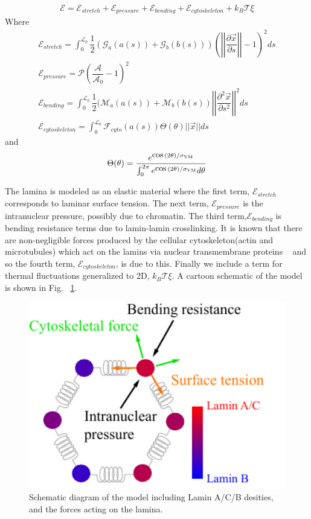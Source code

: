 \begin{align}
\mathcal{E} = \mathcal{E}_{stretch} + \mathcal{E}_{pressure} +\mathcal{E}_{bending} + \mathcal{E}_{cytoskeleton} + k_B\mathcal{T} \xi
\end{align}
Where 
\begin{align}
\mathcal{E}_{stretch} = \displaystyle \int_0^{\mathcal{L}_0} \dfrac{1}{2} (\mathcal{G}_a(a(s)) +\mathcal{G}_b(b(s)) )\left( \left |\left| \dfrac{\partial \vec{x} }{\partial s} \right|\right| - 1\right)^2 ds \\
\mathcal{E}_{pressure}  = \mathcal{P} \left( \dfrac{\mathcal{A}}{\mathcal{A}_0} -1\right)^2  \\
\mathcal{E}_{bending} = \displaystyle\int_0^{\mathcal{L}_0} \dfrac{1}{2 } (\mathcal{M}_a(a(s)) + \mathcal{M}_b (b(s)) \left|\left| \dfrac{\partial^2 \vec{x}}{\partial s^2} \right|\right|^2 ds\\
\mathcal{E}_{cytoskeleton} = \displaystyle\int_0^{\mathcal{L}_0} \mathcal{F}_{cyto} (a(s))\Theta (\theta) || \vec{x} || ds 
\end{align}
and \[ \Theta (\theta) = \dfrac{e^{\cos(2\theta)/\sigma_{\rm VM }}}{\int_0^{ 2\pi} e^{\cos(2\theta)/\sigma_{\rm VM}}d \theta} \]

The lamina is modeled as an elastic material where the first term, $\mathcal{E}_{stretch}$ corresponds to laminar surface tension. The next term, $\mathcal{E}_{pressure}$ is the intranuclear pressure, possibly due to chromatin. The third term,$\mathcal{E}_{bending}$  is bending resistance terms due to lamin-lamin crosslinking. It is known that there are non-negligible forces produced by the cellular cytoskeleton(actin and microtubules) which act on the lamins via nuclear transmembrane proteins ~\cite{Haque2010} and so the fourth term, $\mathcal{E}_{cytoskeleton}$, is due to this. Finally we include a term for thermal fluctuations generalized to 2D, $k_B\mathcal{T} \xi$. A cartoon schematic of the model is shown in Fig. ~\ref{fig::model}.

\begin{figure}[h]
\centering
\captionsetup{width=.9\linewidth}
\includegraphics[width=4.5in]{Project3/figs/model_cartoon.pdf}
\caption{Schematic diagram of the model including Lamin A/C/B desities, and the forces acting on the lamina.}
\label{fig::model}
\end{figure}

